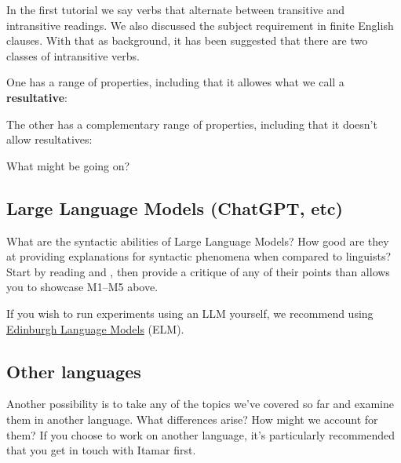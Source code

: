 \documentclass{article}
\begin{document}
In the first tutorial we say verbs that alternate between transitive and intransitive readings. We also discussed the subject requirement in finite English clauses. With that as background, it has been suggested that there are two classes of intransitive verbs.

One has a range of properties, including that it allowes what we call a \textbf{resultative}:
\ea 
    \z
\ex
    \z
\z

The other has a complementary range of properties, including that it doesn't allow resultatives:

\ea
    \z
\ex
    \z
\z

What might be going on?

\subsection{Large Language Models (ChatGPT, etc)}

What are the syntactic abilities of Large Language Models? How good are they at providing explanations for syntactic phenomena when compared to linguists? Start by reading \cite{konnellysanders24} and \cite{begusetal25}, then provide a critique of any of their points than allows you to showcase M1--M5 above.

If you wish to run experiments using an LLM yourself, we recommend using \href{https://elm.edina.ac.uk/}{Edinburgh Language Models} (ELM).


\subsection{Other languages}

Another possibility is to take any of the topics we've covered so far and examine them in another language. What differences arise? How might we account for them? If you choose to work on another language, it's particularly recommended that you get in touch with Itamar first.


\printbibliography
\end{document}
